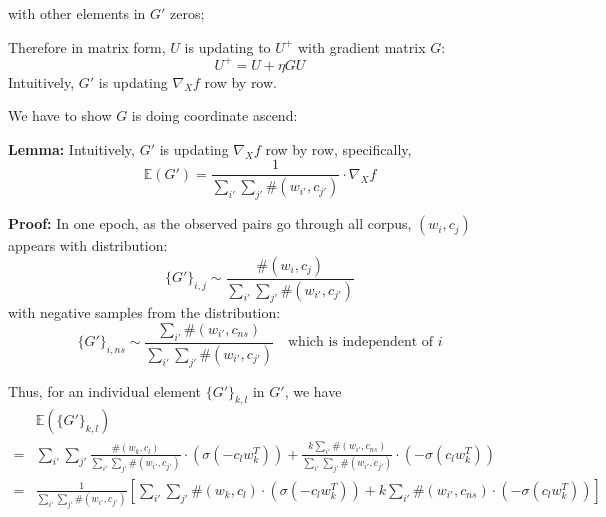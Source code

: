 \documentclass[letterpaper]{article} %
\begin{document}
with other elements in $G'$ zeros;


Therefore in matrix form, $U$ is updating to $U^+$ with gradient matrix $G$:
\begin{equation}
U^+=U+\eta GU \label{eq: ascent}
\end{equation}
Intuitively, $G'$ is updating $\nabla_X f$ row by row.

We have to show $G$ is doing coordinate ascend:

\textbf{Lemma:}  Intuitively, $G'$ is updating $\nabla_X f$ row by row, specifically,
\begin{equation}
	\mathbb{E}(G')=\frac{1}{\sum_{i'}\sum_{j'} \#(w_{i'}, c_{j'})}\cdot \nabla_X f
\end{equation}

\textbf{Proof:} In one epoch, as the observed pairs go through all corpus, $(w_i,c_j)$ appears with distribution: \[\{G'\}_{i,j}\sim\frac{\#(w_i, c_j)}{\sum_{i'}\sum_{j'} \#(w_{i'}, c_{j'})}\]
with negative samples from the distribution:
 \[\{G'\}_{i,ns}\sim\frac{\sum_{i'}\#(w_{i'}, c_{ns})}{\sum_{i'}\sum_{j'} \#(w_{i'}, c_{j'})}\quad\text{which is independent of $i$}\]
 
 Thus, for an individual element $\{G'\}_{k,l}$ in $G'$, we have
 \[
 \begin{split}
&\mathbb{E}(\{G'\}_{k,l})\\
=&\sum_{i'}\sum_{j'}\frac{\#(w_k, c_l)}{\sum_{i'}\sum_{j'} \#(w_{i'}, c_{j'})}\cdot(\sigma(-c_lw^T_k))+\frac{k\sum_{i'}\#(w_{i'}, c_{ns})}{\sum_{i'}\sum_{j'} \#(w_{i'}, c_{j'})}\cdot(-\sigma(c_lw^T_k))\\
=&\frac{1}{\sum_{i'}\sum_{j'} \#(w_{i'}, c_{j'})}[\sum_{i'}\sum_{j'}\#(w_k, c_l)\cdot(\sigma(-c_lw^T_k))+k\sum_{i'}\#(w_{i'}, c_{ns})\cdot(-\sigma(c_lw^T_k))]
 \end{split} \label{eq :expectation}\]
  
\end{document}
